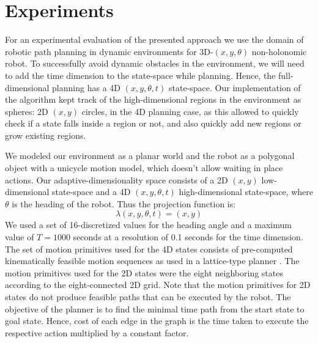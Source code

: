 \fi

\section{Experiments}
\label{sec:exp}
For an experimental evaluation of the presented approach we use the domain of robotic path planning in dynamic environments for 3D-$(x,y,\theta)$ non-holonomic robot. To successfully avoid dynamic obstacles in the environment, we will need to add the time dimension to the state-space while planning. Hence, the full-dimensional planning has a 4D $(x,y,\theta,t)$ state-space. Our implementation of the algorithm kept track of the high-dimensional regions in the environment as spheres: 2D $(x,y)$ circles, in the 4D planning case, as this allowed to quickly check if a state falls inside a region or not, and also quickly add new regions or grow existing regions. 

We modeled our environment as a planar world and the robot as a polygonal object with a unicycle motion model, which doesn't allow waiting in place actions. Our adaptive-dimensionality space consists of a 2D $(x,y)$ low-dimensional state-space and a 4D $(x,y,\theta,t)$ high-dimensional state-space, where $\theta$  is the heading of the robot. Thus the projection function is:
$$ \lambda(x,y,\theta,t) = (x,y)$$
We used a set of 16-discretized values for the heading angle and a maximum value of $T = 1000$ seconds at a resolution of 0.1 seconds for the time dimension. The set of motion primitives used for the 4D states consists of pre-computed kinematically feasible motion sequences as used in a lattice-type planner \cite{likhachev2009planning}. The motion primitives used for the 2D states were the eight neighboring states according to the eight-connected 2D grid. Note that the motion primitives for 2D states do not produce feasible paths that can be executed by the robot. The objective of the planner is to find the minimal time path from the start state to goal state. Hence, cost of each edge in the graph is the time taken to execute the respective action multiplied by a constant factor. 


